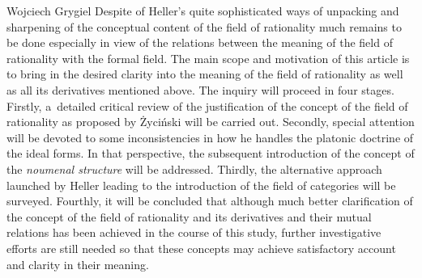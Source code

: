 \begin{artengenv}{Wojciech Grygiel}
Despite of Heller's quite sophisticated ways of unpacking and sharpening of the conceptual content of the field of rationality much remains to be done especially in view of the relations between the meaning of the field of rationality with the formal field. The main scope and motivation of this article is to bring in the desired clarity into the meaning of the field of rationality as well as all its derivatives mentioned above. The inquiry will proceed in four stages. Firstly, a~detailed critical review of the justification of the concept of the field of rationality as proposed by Życiński will be carried out. Secondly, special attention will be devoted to some inconsistencies in how he handles the platonic doctrine of the ideal forms. In that perspective, the subsequent introduction of the concept of the \textit{noumenal structure} will be addressed. Thirdly, the alternative approach launched by Heller leading to the introduction of the field of categories will be surveyed. Fourthly, it will be concluded that although much better clarification of the concept of the field of rationality and its derivatives and their mutual relations has been achieved in the course of this study, further investigative efforts are still needed so that these concepts may achieve satisfactory account and clarity in their meaning.


\end{artengenv}
